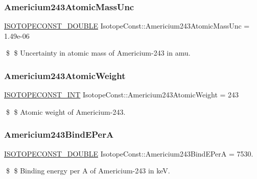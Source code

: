 \subsubsection{\texorpdfstring{Americium243\+Atomic\+Mass\+Unc}{Americium243AtomicMassUnc}}
{\footnotesize\ttfamily \mbox{\hyperlink{group___isotope_const-_macros_ga8f45a7272ce02c0b4c65c44636ed719a}{I\+S\+O\+T\+O\+P\+E\+C\+O\+N\+S\+T\+\_\+\+D\+O\+U\+B\+LE}} Isotope\+Const\+::\+Americium243\+Atomic\+Mass\+Unc = 1.\+49e-\/06}

\$ \$ Uncertainty in atomic mass of Americium-\/243 in amu. \mbox{\label{group___isotope_const-_americium-_am243_gaddfc3a2e129c17c0c170fd164d2c2907}} 
\subsubsection{\texorpdfstring{Americium243\+Atomic\+Weight}{Americium243AtomicWeight}}
{\footnotesize\ttfamily \mbox{\hyperlink{group___isotope_const-_macros_ga5f18360b3e99483a35c32d789e62621c}{I\+S\+O\+T\+O\+P\+E\+C\+O\+N\+S\+T\+\_\+\+I\+NT}} Isotope\+Const\+::\+Americium243\+Atomic\+Weight = 243}

\$ \$ Atomic weight of Americium-\/243. \mbox{\label{group___isotope_const-_americium-_am243_ga0e125a9d5c076ee32a1bb2d15aa6dd9b}} 
\subsubsection{\texorpdfstring{Americium243\+Bind\+E\+PerA}{Americium243BindEPerA}}
{\footnotesize\ttfamily \mbox{\hyperlink{group___isotope_const-_macros_ga8f45a7272ce02c0b4c65c44636ed719a}{I\+S\+O\+T\+O\+P\+E\+C\+O\+N\+S\+T\+\_\+\+D\+O\+U\+B\+LE}} Isotope\+Const\+::\+Americium243\+Bind\+E\+PerA = 7530.}

\$ \$ Binding energy per A of Americium-\/243 in keV. \mbox{\label{group___isotope_const-_americium-_am243_gac2f71e8f77050e069e3067dea22959c9}} 
